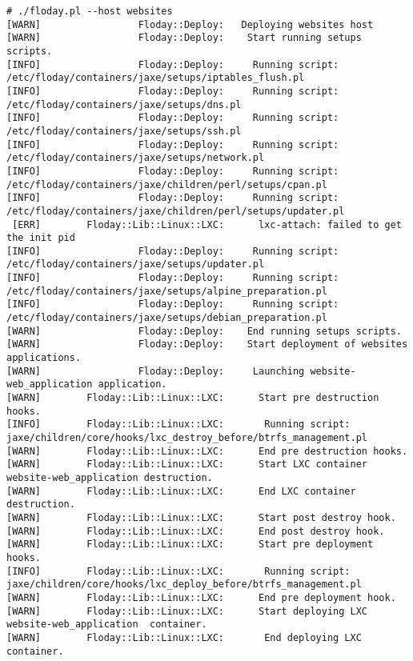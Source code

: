 \begin{lstlisting}[caption={config.yml}, label=fig_1.4_floday, basicstyle=\tiny, xleftmargin=-3cm]
# ./floday.pl --host websites
[WARN]                 Floday::Deploy:   Deploying websites host
[WARN]                 Floday::Deploy:    Start running setups scripts.
[INFO]                 Floday::Deploy:     Running script: /etc/floday/containers/jaxe/setups/iptables_flush.pl
[INFO]                 Floday::Deploy:     Running script: /etc/floday/containers/jaxe/setups/dns.pl
[INFO]                 Floday::Deploy:     Running script: /etc/floday/containers/jaxe/setups/ssh.pl
[INFO]                 Floday::Deploy:     Running script: /etc/floday/containers/jaxe/setups/network.pl
[INFO]                 Floday::Deploy:     Running script: /etc/floday/containers/jaxe/children/perl/setups/cpan.pl
[INFO]                 Floday::Deploy:     Running script: /etc/floday/containers/jaxe/children/perl/setups/updater.pl
 [ERR]        Floday::Lib::Linux::LXC:      lxc-attach: failed to get the init pid
[INFO]                 Floday::Deploy:     Running script: /etc/floday/containers/jaxe/setups/updater.pl
[INFO]                 Floday::Deploy:     Running script: /etc/floday/containers/jaxe/setups/alpine_preparation.pl
[INFO]                 Floday::Deploy:     Running script: /etc/floday/containers/jaxe/setups/debian_preparation.pl
[WARN]                 Floday::Deploy:    End running setups scripts.
[WARN]                 Floday::Deploy:    Start deployment of websites applications.
[WARN]                 Floday::Deploy:     Launching website-web_application application.
[WARN]        Floday::Lib::Linux::LXC:      Start pre destruction hooks.
[INFO]        Floday::Lib::Linux::LXC:       Running script: jaxe/children/core/hooks/lxc_destroy_before/btrfs_management.pl
[WARN]        Floday::Lib::Linux::LXC:      End pre destruction hooks.
[WARN]        Floday::Lib::Linux::LXC:      Start LXC container website-web_application destruction.
[WARN]        Floday::Lib::Linux::LXC:      End LXC container destruction.
[WARN]        Floday::Lib::Linux::LXC:      Start post destroy hook.
[WARN]        Floday::Lib::Linux::LXC:      End post destroy hook.
[WARN]        Floday::Lib::Linux::LXC:      Start pre deployment hooks.
[INFO]        Floday::Lib::Linux::LXC:       Running script: jaxe/children/core/hooks/lxc_deploy_before/btrfs_management.pl
[WARN]        Floday::Lib::Linux::LXC:      End pre deployment hook.
[WARN]        Floday::Lib::Linux::LXC:      Start deploying LXC website-web_application  container.
[WARN]        Floday::Lib::Linux::LXC:       End deploying LXC container.

\end{lstlisting}
